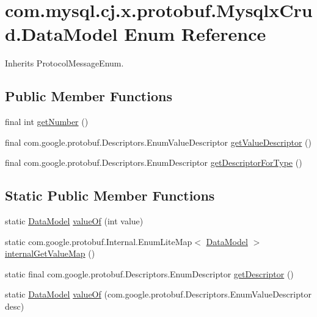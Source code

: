 \hypertarget{enumcom_1_1mysql_1_1cj_1_1x_1_1protobuf_1_1_mysqlx_crud_1_1_data_model}{}\section{com.\+mysql.\+cj.\+x.\+protobuf.\+Mysqlx\+Crud.\+Data\+Model Enum Reference}
\label{enumcom_1_1mysql_1_1cj_1_1x_1_1protobuf_1_1_mysqlx_crud_1_1_data_model}


Inherits Protocol\+Message\+Enum.

\subsection*{Public Member Functions}
\begin{DoxyCompactItemize}
\item 
final int \mbox{\hyperlink{enumcom_1_1mysql_1_1cj_1_1x_1_1protobuf_1_1_mysqlx_crud_1_1_data_model_a3da3a01de91c17efc8d89b03fd4f8055}{get\+Number}} ()
\item 
final com.\+google.\+protobuf.\+Descriptors.\+Enum\+Value\+Descriptor \mbox{\hyperlink{enumcom_1_1mysql_1_1cj_1_1x_1_1protobuf_1_1_mysqlx_crud_1_1_data_model_a5f77d8ec1e3f09c4364d71a759806e56}{get\+Value\+Descriptor}} ()
\item 
final com.\+google.\+protobuf.\+Descriptors.\+Enum\+Descriptor \mbox{\hyperlink{enumcom_1_1mysql_1_1cj_1_1x_1_1protobuf_1_1_mysqlx_crud_1_1_data_model_a66cd99042619d44a9eaff159f0b1e27e}{get\+Descriptor\+For\+Type}} ()
\end{DoxyCompactItemize}
\subsection*{Static Public Member Functions}
\begin{DoxyCompactItemize}
\item 
static \mbox{\hyperlink{enumcom_1_1mysql_1_1cj_1_1x_1_1protobuf_1_1_mysqlx_crud_1_1_data_model}{Data\+Model}} \mbox{\hyperlink{enumcom_1_1mysql_1_1cj_1_1x_1_1protobuf_1_1_mysqlx_crud_1_1_data_model_a7b57fd28cc3eccbbec24d4cf6f435469}{value\+Of}} (int value)
\item 
static com.\+google.\+protobuf.\+Internal.\+Enum\+Lite\+Map$<$ \mbox{\hyperlink{enumcom_1_1mysql_1_1cj_1_1x_1_1protobuf_1_1_mysqlx_crud_1_1_data_model}{Data\+Model}} $>$ \mbox{\hyperlink{enumcom_1_1mysql_1_1cj_1_1x_1_1protobuf_1_1_mysqlx_crud_1_1_data_model_ad955a3eeb396be25dc6ac79a17d3e9e0}{internal\+Get\+Value\+Map}} ()
\item 
static final com.\+google.\+protobuf.\+Descriptors.\+Enum\+Descriptor \mbox{\hyperlink{enumcom_1_1mysql_1_1cj_1_1x_1_1protobuf_1_1_mysqlx_crud_1_1_data_model_a54ba897915bc10ff7d5467c89f6b3cf9}{get\+Descriptor}} ()
\item 
static \mbox{\hyperlink{enumcom_1_1mysql_1_1cj_1_1x_1_1protobuf_1_1_mysqlx_crud_1_1_data_model}{Data\+Model}} \mbox{\hyperlink{enumcom_1_1mysql_1_1cj_1_1x_1_1protobuf_1_1_mysqlx_crud_1_1_data_model_a9e26dbd6fe1c7ac6f4db5d839607ae9a}{value\+Of}} (com.\+google.\+protobuf.\+Descriptors.\+Enum\+Value\+Descriptor desc)
\end{DoxyCompactItemize}
